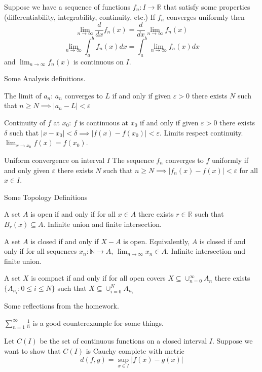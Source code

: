 \documentclass{article}
\newcommand{\N}{\mathbb{N}}
\newcommand{\R}{\mathbb{R}}
\newcommand{\eps}{\varepsilon}
\newcommand{\ra}[1][]{\xrightarrow{#1}}
\begin{document}
\begin{theorem}
  Suppose we have a sequence of functions $f_n:I\ra \R$ that satisfy some properties (differentiability, integrability, continuity, etc.) If $f_n$ converges uniformly then
    $$\lim_{n\to\infty}\frac{d}{dx}f_n(x) =\frac{d}{dx}\lim_{n\to\infty}f_n(x)$$
    $$\lim_{n\to\infty}\int_a^b f_n(x)dx = \int_a^b\lim_{n\to\infty}f_n(x)dx$$
and $\lim_{n\to\infty}f_n(x)$ is continuous on $I$.
\end{theorem}
Some Analysis definitions.
\begin{definition}
  The limit of $a_n$: $a_n$ converges to $L$ if and only if given $\eps>0$ there exists $N$ such that $n\geq N\implies |a_n-L|<\eps$
\end{definition}
\begin{definition}
  Continuity of $f$ at $x_0$: $f$ is continuous at $x_0$ if and only if given $\eps>0$ there exists $\delta$ such that $|x-x_0|<\delta\implies |f(x)-f(x_0)|<\eps$. Limits respect continuity. $\lim_{x\to x_0}f(x)=f(x_0)$.
\end{definition}
\begin{definition}
  Uniform convergence on interval $I$ The sequence $f_n$ converges to $f$ uniformly if and only given $\eps$ there exists $N$ such that $n\geq N\implies |f_n(x)-f(x)|<\eps$ for all $x\in I$.
\end{definition}
Some Topology Definitions
\begin{definition}
  A set $A$ is open if and only if for all $x\in A$ there exists $r\in \R$ such that $B_r(x)\subseteq A$. Infinite union and finite intersection.
\end{definition}
\begin{definition}
  A set $A$ is closed if and only if $X-A$ is open. Equivalently, $A$ is closed if and only if for all sequences $x_n:\N\ra A$, $\lim_{n\to\infty}x_n\in A$. Infinite intersection and finite union.
\end{definition}
\begin{definition}
  A set $X$ is compact if and only if for all open covers $X\subseteq \cup_{n=0}^\infty A_n$ there exists $\{A_{n_i}:0\leq i \leq N\}$ such that $X\subseteq \cup_{i=0}^NA_{n_i}$
\end{definition}
Some reflections from the homework.
\begin{fact}
  $\sum_{n=1}^\infty\frac{1}{n}$ is a good counterexample for some things.
\end{fact}
\begin{problem}
  Let $C(I)$ be the set of continuous functions on a closed interval $I$. Suppose we want to show that $C(I)$ is Cauchy complete with metric
  $$d(f,g)=\sup_{x\in I}|f(x)-g(x)|$$
\end{problem}
\end{document}
